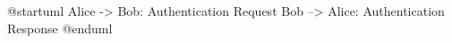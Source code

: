 \documentclass{article}
\begin{document}
\begin{plantuml}
@startuml
Alice -> Bob: Authentication Request
Bob --> Alice: Authentication Response
@enduml
\end{plantuml}
\end{document}
